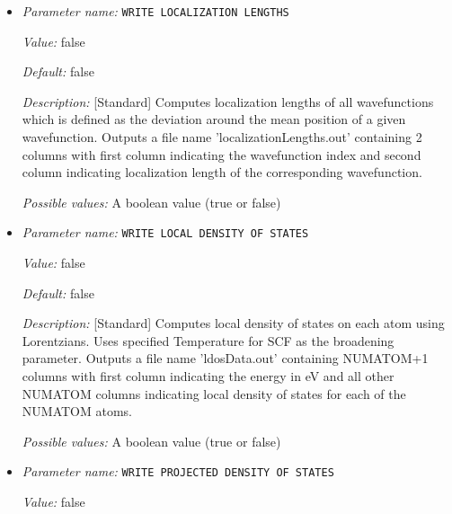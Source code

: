 \begin{itemize}
{\it Possible values:} A boolean value (true or false)
\item {\it Parameter name:} {\tt WRITE LOCALIZATION LENGTHS}
\label{parameters:Post_2dprocessing Options/WRITE LOCALIZATION LENGTHS}
\label{parameters:Post_2dprocessing_20Options/WRITE_20LOCALIZATION_20LENGTHS}


{\it Value:} false


{\it Default:} false


{\it Description:} [Standard] Computes localization lengths of all wavefunctions which is defined as the deviation around the mean position of a given wavefunction. Outputs a file name 'localizationLengths.out' containing 2 columns with first column indicating the wavefunction index and second column indicating localization length of the corresponding wavefunction.


{\it Possible values:} A boolean value (true or false)
\item {\it Parameter name:} {\tt WRITE LOCAL DENSITY OF STATES}
\label{parameters:Post_2dprocessing Options/WRITE LOCAL DENSITY OF STATES}
\label{parameters:Post_2dprocessing_20Options/WRITE_20LOCAL_20DENSITY_20OF_20STATES}


{\it Value:} false


{\it Default:} false


{\it Description:} [Standard] Computes local density of states on each atom using Lorentzians. Uses specified Temperature for SCF as the broadening parameter. Outputs a file name 'ldosData.out' containing NUMATOM+1 columns with first column indicating the energy in eV and all other NUMATOM columns indicating local density of states for each of the NUMATOM atoms.


{\it Possible values:} A boolean value (true or false)
\item {\it Parameter name:} {\tt WRITE PROJECTED DENSITY OF STATES}
\label{parameters:Post_2dprocessing Options/WRITE PROJECTED DENSITY OF STATES}
\label{parameters:Post_2dprocessing_20Options/WRITE_20PROJECTED_20DENSITY_20OF_20STATES}


{\it Value:} false



\end{itemize}
